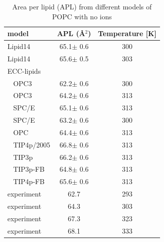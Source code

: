 \documentclass[aip,jcp,twocolumn]{revtex4}
\begin{document}
\begin{table}
  \caption{Area per lipid (APL) from different models of POPC with no ions\label{tab:apls_si} }
  \begin{tabular}{l|c c}
    model          & APL (\AA$^2$)   & Temperature [K] \\
    \hline
    Lipid14                   & 65.1$\pm$ 0.6  &  300 \\
    Lipid14 \cite{dickson14}  & 65.6$\pm$ 0.5  &  303 \\
    \hline
    ECC-lipids &        &  \\
    ~ OPC3           & 62.2$\pm$ 0.6   &  300       \\
    ~ OPC3           & 64.2$\pm$ 0.6   &  313       \\
    ~ SPC/E          & 65.1$\pm$ 0.6   &  313       \\
    ~ SPC/E          & 63.2$\pm$ 0.6   &  300       \\
    ~ OPC            & 64.4$\pm$ 0.6   &  313       \\
    ~ TIP4p/2005     & 66.8$\pm$ 0.6   &  313       \\
    ~ TIP3p          & 66.2$\pm$ 0.6   &  313       \\
    ~ TIP3p-FB       & 64.8$\pm$ 0.6   &  313       \\
    ~ TIP4p-FB       & 65.6$\pm$ 0.6   &  313       \\
    \hline
    experiment   & 62.7  &  293    \\
    experiment \cite{kucerka11} & 64.3  &  303    \\
    experiment  & 67.3  &  323    \\
    experiment  & 68.1  &  333    \\
    \hline
  \end{tabular} \\
\end{table}
\end{document}
